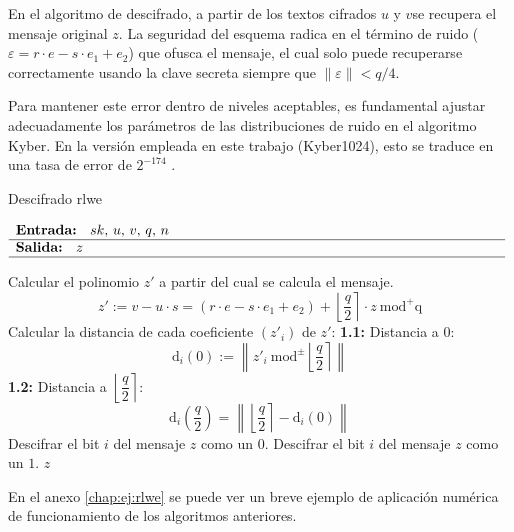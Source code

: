 En el algoritmo de descifrado, a partir de los textos cifrados \(u\) y \(v\)se recupera el mensaje original \(z\). La seguridad del esquema radica en el término de ruido ($\varepsilon=r\cdot e- s\cdot e_1 +e_2$) que ofusca el mensaje, el cual solo puede recuperarse correctamente usando la clave secreta siempre que \(\left\|\varepsilon\right\|< q/4\).
\newline

Para mantener este error dentro de niveles aceptables, es fundamental ajustar adecuadamente los parámetros de las distribuciones de ruido en el algoritmo Kyber. En la versión empleada en este trabajo (Kyber1024), esto se traduce en una tasa de error de $2^{-174}$ \cite{pqcrystalssecurity}.
\newpage
\begin{algorithm}[H]
	\caption{Descifrado \gls{rlwe} \protect\footnotemark[\value{footnote}]} 
	$\begin{array}{p{\textwidth}}
		\textbf{Entrada: } \(sk\), \(u\), \(v\), \(q\), \(n\)\\ 
		\hline
		\textbf{Salida: } \(z\)\\ 
		\hline
	\end{array}$
	\begin{algorithmic}[1]
		\State Calcular el polinomio \(z'\) a partir del cual se calcula el mensaje.
		\begin{equation}
			\label{eq:ruidoLWE}
			z':=v-u\cdot s = \left(r\cdot e- s\cdot e_1 +e_2\right)+\left\lfloor \dfrac{q}{2} \right\rceil \cdot z \ \text{mod}^{+}\text{q}
		\end{equation}
		\State Calcular la distancia de cada coeficiente \((z'_i)\) de \(z'\):
		\Statex \hspace{1em} \textbf{1.1:} Distancia a \(0\):
		\begin{equation}
			\text{d}_i(0):=\left\| z'_i \ \text{mod}^{\pm} \left\lfloor \dfrac{q}{2} \right\rceil \right\| 
		\end{equation} 
		\Statex \hspace{1em} \textbf{1.2:} Distancia a $\left\lfloor \dfrac{q}{2} \right\rceil$:
			\begin{equation}
			\text{d}_i\left(\dfrac{q}{2}\right)=\left\| \left\lfloor \dfrac{q}{2} \right\rceil - \text{d}_i(0)\right\| 
		\end{equation} 
			\Statex
			\State Descifrar el bit \(i\) del mensaje \(z\) como un \(0\).
		\Else
			\State Descifrar el bit \(i\) del mensaje \(z\) como un \(1\).
		\EndIf
		\State \Return \(z\)
	\end{algorithmic}
\end{algorithm}
 En el anexo \ref{chap:ej:rlwe} se puede ver un breve ejemplo de aplicación numérica de funcionamiento de los algoritmos anteriores.

